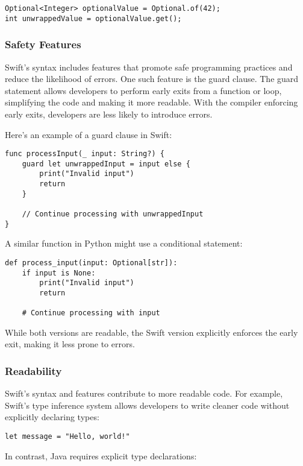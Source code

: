 \begin{verbatim}
Optional<Integer> optionalValue = Optional.of(42);
int unwrappedValue = optionalValue.get();
\end{verbatim}

\subsubsection{Safety Features}
Swift's syntax includes features that promote safe programming practices and reduce the likelihood of errors. One such feature is the guard clause. The guard statement allows developers to perform early exits from a function or loop, simplifying the code and making it more readable. With the compiler enforcing early exits, developers are less likely to introduce errors.

Here's an example of a guard clause in Swift:

\begin{verbatim}
func processInput(_ input: String?) {
    guard let unwrappedInput = input else {
        print("Invalid input")
        return
    }
    
    // Continue processing with unwrappedInput
}
\end{verbatim}

A similar function in Python might use a conditional statement:

\begin{verbatim}
def process_input(input: Optional[str]):
    if input is None:
        print("Invalid input")
        return

    # Continue processing with input
\end{verbatim}

While both versions are readable, the Swift version explicitly enforces the early exit, making it less prone to errors.

\subsubsection{Readability}
Swift's syntax and features contribute to more readable code. For example, Swift's type inference system allows developers to write cleaner code without explicitly declaring types:

\begin{verbatim}
let message = "Hello, world!"
\end{verbatim}

In contrast, Java requires explicit type declarations:


